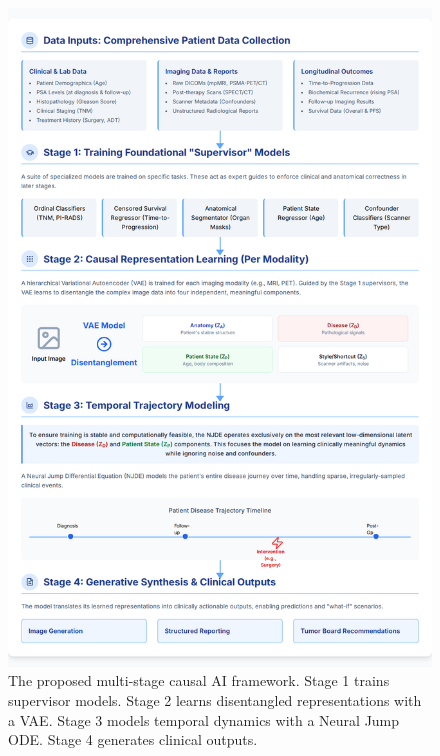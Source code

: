 \documentclass[11pt, a4paper]{article}
\begin{document}
\begin{figure}[H]
    \centering
    \includegraphics[width=\textwidth]{ml.png}
    \caption{The proposed multi-stage causal AI framework. Stage 1 trains supervisor models. Stage 2 learns disentangled representations with a VAE. Stage 3 models temporal dynamics with a Neural Jump ODE. Stage 4 generates clinical outputs.}
    \label{fig:ml_framework}
\end{figure}
\end{document}
